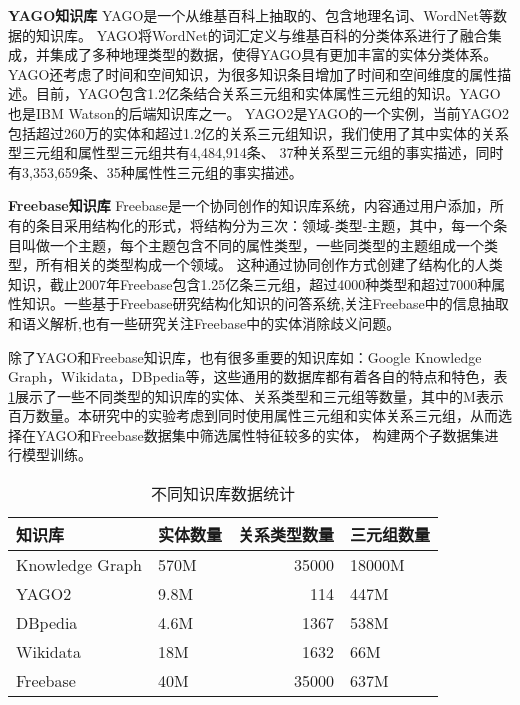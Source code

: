 \textbf{YAGO知识库} YAGO是一个从维基百科上抽取的、包含地理名词、WordNet\cite{Kasneci2008TheYA}等数据的知识库。
YAGO将WordNet的词汇定义与维基百科的分类体系进行了融合集成\cite{Suchanek2008YAGOAL}，并集成了多种地理类型的数据，使得YAGO具有更加丰富的实体分类体系。YAGO还考虑了时间和空间知识\cite{Hoffart2011YAGO2EA}，为很多知识条目增加了时间和空间维度的属性描述。目前，YAGO包含1.2亿条结合关系三元组和实体属性三元组的知识。YAGO也是IBM Watson\cite{Ferrucci2010BuildingWA}的后端知识库之一。
YAGO2\cite{Hoffart2013YAGO2AS}是YAGO的一个实例，当前YAGO2包括超过260万的实体和超过1.2亿的关系三元组知识，我们使用了其中实体的关系型三元组和属性型三元组共有4,484,914条、
37种关系型三元组的事实描述，同时有3,353,659条、35种属性性三元组的事实描述。

\textbf{Freebase知识库} Freebase\cite{Bollacker2008FreebaseAC}是一个协同创作的知识库系统，内容通过用户添加，所有的条目采用结构化的形式，将结构分为三次：领域-类型-主题，其中，每一个条目叫做一个主题，每个主题包含不同的属性类型，一些同类型的主题组成一个类型，所有相关的类型构成一个领域。
这种通过协同创作方式创建了结构化的人类知识，截止2007年Freebase包含1.25亿条三元组，超过4000种类型和超过7000种属性知识。一些基于Freebase研究结构化知识的问答系统\cite{Yao2014InformationEO}\cite{Yao2015LeanQA},关注Freebase中的信息抽取和语义解析\cite{Yao2014FreebaseQI},也有一些研究关注Freebase中的实体消除歧义问题\cite{Zheng2012EntityDW}。

除了YAGO和Freebase知识库，也有很多重要的知识库如：Google Knowledge Graph，Wikidata，DBpedia等，这些通用的数据库都有着各自的特点和特色，表\ref{tab:addlabel-kb-list}展示了一些不同类型的知识库的实体、关系类型和三元组等数量，其中的M表示百万数量。本研究中的实验考虑到同时使用属性三元组和实体关系三元组，从而选择在YAGO和Freebase数据集中筛选属性特征较多的实体，
构建两个子数据集进行模型训练。

\begin{table}[htbp]
  \centering
  \caption{不同知识库数据统计}
    \begin{tabular}{|l|l|r|l|}
    \hline
    知识库   & 实体数量  & \multicolumn{1}{l|}{关系类型数量} & 三元组数量 \\
    \hline
    Knowledge Graph & 570M  & 35000 & 18000M \\
    \hline
    YAGO2 & 9.8M  & 114   & 447M \\
    \hline
    DBpedia & 4.6M  & 1367  & 538M \\
    \hline
    Wikidata & 18M   & 1632  & 66M \\
    \hline
    Freebase & 40M   & 35000 & 637M \\
    \hline
    \end{tabular}%
  \label{tab:addlabel-kb-list}%
\end{table}%


